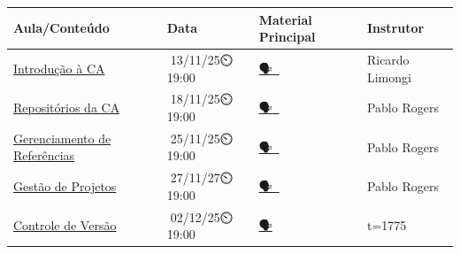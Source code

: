 \documentclass[
  a4paper,
]{book}
\newcommand{\emojitext}[1]{{\emoji #1}}
\begin{document}
\begin{longtable}[]{@{}
  >{\raggedright\arraybackslash}p{}
  >{\centering\arraybackslash}p{}
  >{\centering\arraybackslash}p{}
  >{\centering\arraybackslash}p{}@{}}
\toprule\noalign{}
\begin{minipage}[b]{\linewidth}\raggedright
Aula/Conteúdo
\end{minipage} & \begin{minipage}[b]{\linewidth}\centering
Data
\end{minipage} & \begin{minipage}[b]{\linewidth}\centering
Material Principal
\end{minipage} & \begin{minipage}[b]{\linewidth}\centering
Instrutor
\end{minipage} \\
\midrule\noalign{}
\endhead
\bottomrule\noalign{}
\endlastfoot
\href{01-intro.html}{Introdução à CA} &
\emojitext{📅}13/11/25\emojitext{⏲️}19:00 &
\href{./resources/01-intro.pdf}{\emojitext{🗣}}\href{https://www.youtube.com/live/7ewEcTATkZM?si=Lq40IAoDgsy_A619}{\emojitext{🎥}}\href{https://doi.org/10.1590/S0034-759020230408}{\emojitext{📓}}
& Ricardo Limongi \\
\href{02-osf.html}{Repositórios da CA} &
\emojitext{📅}18/11/25\emojitext{⏲️}19:00 &
\href{https://osf.io/wm8vs}{\emojitext{🗣️}}\href{https://www.youtube.com/watch?v=B19MPDJX_vs}{\emojitext{🎥}}\href{https://doi.org/10.1002/cpet.32}{\emojitext{📓}}
& Pablo Rogers \\
\href{03-zotero.html}{Gerenciamento de Referências} &
\emojitext{📅}25/11/25\emojitext{⏲️}19:00 &
\href{https://osf.io/emxz8}{\emojitext{🗣️}}\href{https://youtu.be/tnbwKj6-pD8?si=Yx9IC2LhrplvA6g1}{\emojitext{🎥}}\href{https://kuscholarworks.ku.edu/handle/1808/34983}{\emojitext{📓}}
& Pablo Rogers \\
\href{04-project.html}{Gestão de Projetos} &
\emojitext{📅}27/11/27\emojitext{⏲️}19:00 &
\href{./resources/04-project.pdf}{\emojitext{🗣️}}\href{https://youtu.be/l8yh3f8Tbv8?si=Yeq-xRxmffF7S1dk}{\emojitext{🎥}}\href{https://doi.org/10.1371/journal.pcbi.1005510}{\emojitext{📓}}
& Pablo Rogers \\
\href{05-git.html}{Controle de Versão} &
\emojitext{📅}02/12/25\emojitext{⏲️}19:00 &
\href{./resources/05-git.pdf}{\emojitext{🗣️}}\href{https://youtu.be/uQL6NOSd9cc?si=TIYenlvIzKpoQ2dQ&t=1775}{\emojitext{🎥}}\href{https://doi.org/10.1177/2515245918754826}{\emojitext{📓}}

\end{longtable}
\end{document}
